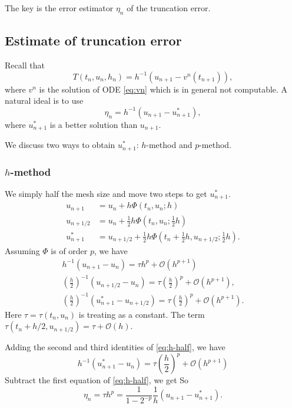 \documentclass[10pt]{amsart}
\begin{document}
The key is the error estimator $\eta_n$ of the truncation error. 

\subsection{Estimate of truncation error}
Recall that 
$$
T(t_n, u_n, h_n) = h^{-1}(u_{n+1} - v^n(t_{n+1})),
$$
where $v^n$ is the solution of ODE \eqref{eq:vn} which is in general not computable. A natural ideal is to use 
$$
\eta_n = h^{-1}(u_{n+1} - u_{n+1}^*),
$$
where $u_{n+1}^*$ is a better solution than $u_{n+1}$. 

We discuss two ways to obtain $u_{n+1}^*$: $h$-method and $p$-method.

\subsubsection{$h$-method} We simply half the mesh size and move two steps to get $u_{n+1}^*$. 
\begin{equation}
\begin{aligned}
{u}_{n+1} & = {u}_n+h {\Phi}(t_n, u_n ; h) \\
{u}_{n+1/2} & = {u}_n +\frac{1}{2} h {\Phi}\left(t_n, u_n ; \frac{1}{2} h\right) \\
{u}_{n+1}^* & ={u}_{n+1/2}+\frac{1}{2} h {\Phi}\left(t_n+\frac{1}{2} h, {u}_{n+1/2}; \frac{1}{2} h\right).
\end{aligned}
\end{equation}
Assuming $\Phi$ is of order $p$, we have
\begin{equation}\label{eq:h-half}
\begin{aligned}
h^{-1}({u}_{n+1} -  {u}_n) = \tau h^p + \mathcal O(h^{p+1})\\
\left (\frac{h}{2}\right )^{-1}({u}_{n+1/2} -  {u}_n) = \tau \left (\frac{h}{2}\right )^p + \mathcal O(h^{p+1}),\\
\left (\frac{h}{2}\right )^{-1}(u_{n+1}^* - {u}_{n+1/2}) = \tau \left (\frac{h}{2}\right )^p + \mathcal O(h^{p+1}).
\end{aligned}
\end{equation}
Here $\tau = \tau(t_n, u_n)$ is treating as a constant. The term $\tau(t_{n}+h/2, u_{n+1/2}) = \tau + \mathcal O(h)$. 

Adding the second and third identities of \eqref{eq:h-half}, we have
$$
h^{-1}({u}_{n+1}^* -  {u}_n) = \tau \left (\frac{h}{2}\right )^p + \mathcal O(h^{p+1})
$$
Subtract the first equation of  \eqref{eq:h-half}, we get 
So 
$$
\eta_n = \tau h^p =\frac{1}{1-2^{-p}} \frac{1}{h}(u_{n+1} - u_{n+1}^*).
$$
\end{document}

